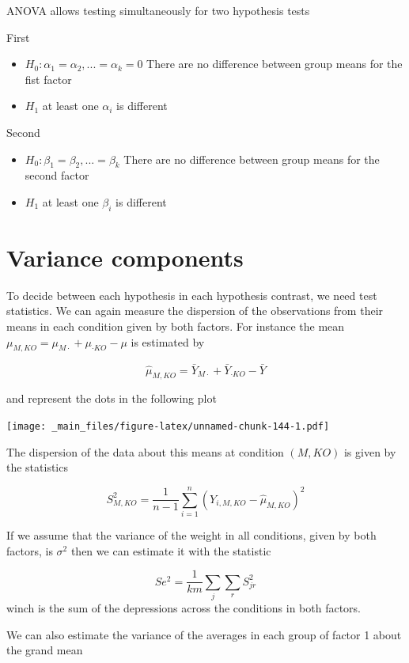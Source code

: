 \documentclass[
]{book}
\begin{document}
ANOVA allows testing simultaneously for two hypothesis tests

First

\begin{itemize}
\item
  \(H_0: \alpha_1=\alpha_2, ...=\alpha_k=0\) There are no difference between group means for the fist factor
\item
  \(H_1\) at least one \(\alpha_i\) is different
\end{itemize}

Second

\begin{itemize}
\item
  \(H_0: \beta_1=\beta_2, ...=\beta_k\) There are no difference between group means for the second factor
\item
  \(H_1\) at least one \(\beta_i\) is different
\end{itemize}

\hypertarget{variance-components}{%
\section{Variance components}\label{variance-components}}

To decide between each hypothesis in each hypothesis contrast, we need test statistics. We can again measure the dispersion of the observations from their means in each condition given by both factors. For instance the mean \(\mu_{M,KO}=\mu_{M \cdot} + \mu_{\cdot KO} - \mu\) is estimated by

\[\hat{\mu}_{M,KO}= \bar{Y}_{M \cdot}+\bar{Y}_{\cdot KO} - \bar{Y}\]

and represent the dots in the following plot

\texttt{[image: \_main\_files/figure-latex/unnamed-chunk-144-1.pdf]}

The dispersion of the data about this means at condition \((M,KO)\) is given by the statistics

\[S^2_{M,KO}=\frac{1}{n-1}\sum_{i=1}^n (Y_{i,M,KO}-\hat{\mu}_{M,KO})^2\]

If we assume that the variance of the weight in all conditions, given by both factors, is \(\sigma^2\) then we can estimate it with the statistic

\[Se^2= \frac{1}{km}\sum_j \sum_r S^2_{jr}\]
winch is the sum of the depressions across the conditions in both factors.

We can also estimate the variance of the averages in each group of factor 1 about the grand mean
\end{document}
